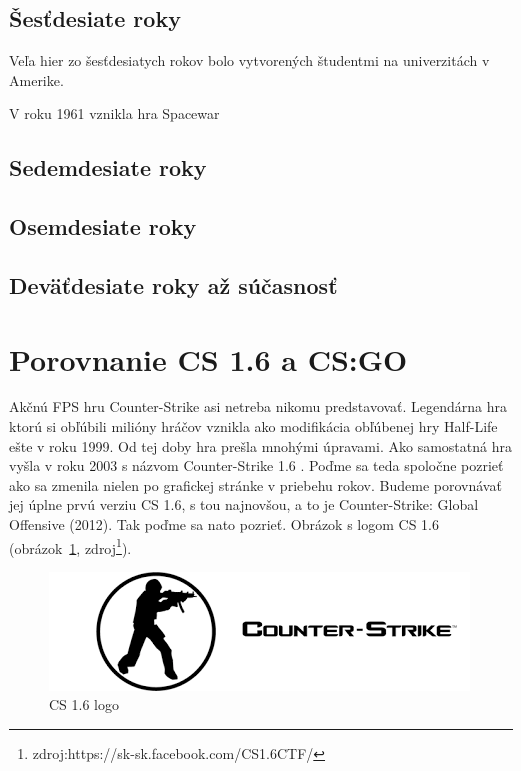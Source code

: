\documentclass[10pt,oneside,slovak,a4paper]{article}
\begin{document}
\subsection{Šesťdesiate roky} \label{sestdesiate}
Veľa hier zo šesťdesiatych rokov bolo vytvorených študentmi na univerzitách v Amerike. 

V roku 1961 vznikla hra Spacewar


\subsection{Sedemdesiate roky} \label{sedemdesiate}



\subsection{Osemdesiate roky} \label{osemdesiate}



\subsection{Deväťdesiate roky až súčasnosť} \label{devatdesiate}


\section{Porovnanie CS 1.6 a CS:GO} \label{porovnanie}

Akčnú FPS hru Counter-Strike asi netreba nikomu predstavovať. Legendárna hra ktorú si obľúbili milióny hráčov vznikla ako modifikácia obľúbenej hry Half-Life ešte v roku 1999. Od tej doby hra prešla mnohými úpravami. Ako samostatná hra vyšla v roku 2003 s názvom Counter-Strike 1.6 . Poďme sa teda spoločne pozrieť ako sa zmenila nielen po grafickej stránke v priebehu rokov. Budeme porovnávať jej úplne prvú verziu CS 1.6, s tou najnovšou, a to je Counter-Strike: Global Offensive (2012). Tak poďme sa nato pozrieť. Obrázok s logom CS 1.6 (obrázok~\ref{f:cs1.6}, zdroj\footnote{zdroj:https://sk-sk.facebook.com/CS1.6CTF/}).

\begin{figure}[tbh]
\centering
\includegraphics[scale=0.8]{cs16.png}
\caption{CS 1.6 logo}
\label{f:cs1.6}
\end{figure}
\end{document}

